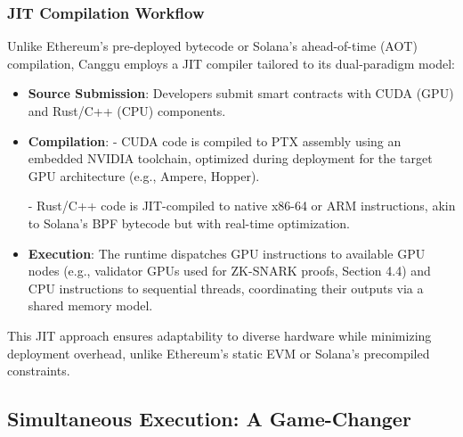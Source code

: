 \documentclass[12pt]{article}
\begin{document}
\subsubsection{JIT Compilation Workflow}
\begin{justify}
    Unlike Ethereum’s pre-deployed bytecode or Solana’s ahead-of-time (AOT) compilation, Canggu employs a JIT compiler tailored to its dual-paradigm model:

    \begin{itemize}
        \item \textbf{Source Submission}: Developers submit smart contracts with CUDA (GPU) and Rust/C++ (CPU) components.
        \item \textbf{Compilation}:  
            - CUDA code is compiled to PTX assembly using an embedded NVIDIA toolchain, optimized during deployment for the target GPU architecture (e.g., Ampere, Hopper).

            - Rust/C++ code is JIT-compiled to native x86-64 or ARM instructions, akin to Solana’s BPF bytecode but with real-time optimization.

        \item \textbf{Execution}: The runtime dispatches GPU instructions to available GPU nodes (e.g., validator GPUs used for ZK-SNARK proofs, Section 4.4) and CPU instructions to sequential threads, coordinating their outputs via a shared memory model.
    \end{itemize}
    This JIT approach ensures adaptability to diverse hardware while minimizing deployment overhead, unlike Ethereum’s static EVM or Solana’s precompiled constraints.
    
\end{justify}

\subsection{Simultaneous Execution: A Game-Changer}
\end{document}
